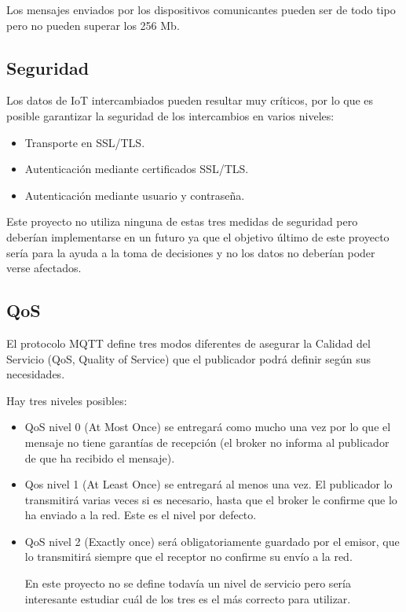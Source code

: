 Los mensajes enviados por los dispositivos comunicantes pueden ser de todo tipo pero no pueden superar los 256 Mb.

\subsection{Seguridad}
Los datos de IoT intercambiados pueden resultar muy críticos, por lo que es posible garantizar la seguridad de los intercambios en varios niveles:
\begin{itemize}
\item Transporte en SSL/TLS.
\item Autenticación mediante certificados SSL/TLS.
\item Autenticación mediante usuario y contraseña.
\end{itemize}

Este proyecto no utiliza ninguna de estas tres medidas de seguridad pero deberían implementarse en un futuro ya que el objetivo último de este proyecto sería para la ayuda a la toma de decisiones y no los datos no deberían poder verse afectados.

\subsection{QoS}
El protocolo MQTT define tres modos diferentes de asegurar la Calidad del Servicio (QoS, Quality of Service) que el publicador podrá definir según sus necesidades.

Hay tres niveles posibles:
\begin{itemize}
\item QoS nivel 0 (At Most Once) se entregará como mucho una vez por lo que el mensaje no tiene garantías de recepción (el broker no informa al publicador de que ha recibido el mensaje).

\item Qos nivel 1 (At Least Once) se entregará al menos una vez. El publicador lo transmitirá varias veces si es necesario, hasta que el broker le confirme que lo ha enviado a la red. Este es el nivel por defecto.

\item QoS nivel 2 (Exactly once) será obligatoriamente guardado por el emisor, que lo transmitirá siempre que el receptor no confirme su envío a la red.

En este proyecto no se define todavía un nivel de servicio pero sería interesante estudiar cuál de los tres es el más correcto para utilizar.
\end{itemize}

